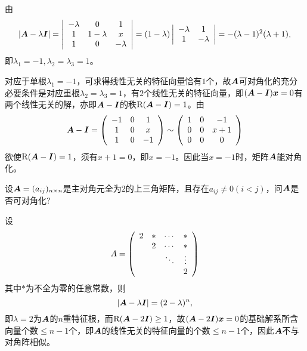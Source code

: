\begin{frame}[fragile]\ft{\subsecname}

\begin{jie}
  由
  $$
  |\boldsymbol{A}-\lambda\boldsymbol{I}|=
  \left|
    \begin{array}{ccc}
      -\lambda&0&1\\
      1&1-\lambda&x\\
      1&0&-\lambda
    \end{array}
  \right|
  =(1-\lambda)
  \left|
    \begin{array}{ccc}
      -\lambda&1\\
      1&-\lambda
    \end{array}
  \right|=-(\lambda-1)^2(\lambda+1),
  $$
  即$\lambda_1=-1,\lambda_2=\lambda_3=1$。

  对应于单根$\lambda_1=-1$，可求得线性无关的特征向量恰有$1$个，故$\boldsymbol{A}$可对角化的充分必要条件是对应重根$\lambda_2=\lambda_3=1$，有$2$个线性无关的特征向量，即$(\boldsymbol{A}-\boldsymbol{I}){\boldsymbol{x}}=0$有两个线性无关的解，亦即$\boldsymbol{A}-\boldsymbol{I}$的秩$\mathrm{R}(\boldsymbol{A}-\boldsymbol{I})=1$。由
  $$
  \boldsymbol{A}-\boldsymbol{I}=\left(
    \begin{array}{ccc}
      -1&0&1\\
      1&0&x\\
      1&0&-1
    \end{array}
  \right)\sim \left(
    \begin{array}{ccc}
      1&0&-1\\
      0&0&x+1\\
      0&0&0
    \end{array}
  \right)
  $$
  欲使$\mathrm{R}(\boldsymbol{A}-\boldsymbol{I})=1$，须有$x+1=0$，即$x=-1$。因此当$x=-1$时，矩阵$\boldsymbol{A}$能对角化。
\end{jie}

\end{frame}

\begin{frame}[fragile]\ft{\subsecname}

\begin{li}
  设$\boldsymbol{A}=(a_{ij})_{n\times n}$是主对角元全为$2$的上三角矩阵，且存在$a_{ij}\ne 0(i<j)$，问$\boldsymbol{A}$是否可对角化?
\end{li}

\end{frame}

\begin{frame}[fragile]\ft{\subsecname}
\begin{jie}
  设
  $$
  A=\left(
    \begin{array}{cccc}
      2&*&\cdots&*\\
       &2&\cdots&*\\
       &&\ddots&\vdots\\
       &&&2
    \end{array}
  \right)
  $$
  其中$*$为不全为零的任意常数，则
  $$
  |\boldsymbol{A}-\lambda\boldsymbol{I}|=(2-\lambda)^n,
  $$
  即$\lambda=2$为$\boldsymbol{A}$的$n$重特征根，而$\mathrm{R}(\boldsymbol{A}-2\boldsymbol{I})\ge 1$，故$(\boldsymbol{A}-2\boldsymbol{I}){\boldsymbol{x}}=0$的基础解系所含向量个数$\le n-1$个，即$\boldsymbol{A}$的线性无关的特征向量的个数$\le n-1$个，因此$\boldsymbol{A}$不与对角阵相似。
\end{jie}
\end{frame}


